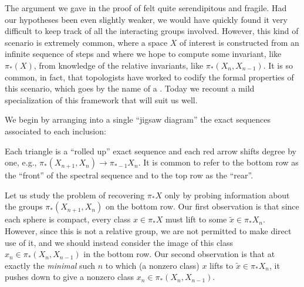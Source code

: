 The argument we gave in the proof of  felt quite serendipitous and fragile.
Had our hypotheses been even slightly weaker, we would have quickly found it very difficult to keep track of all the interacting groups involved.
However, this kind of scenario is extremely common, where a space $X$ of interest is constructed from an infinite sequence of steps
and where we hope to compute some invariant, like $\pi_*(X)$, from knowledge of the relative invariants, like $\pi_*(X_n, X_{n-1})$.
It is so common, in fact, that topologists have worked to codify the formal properties of this scenario, which goes by the name of a .
Today we recount a mild specialization of this framework that will suit us well.

We begin by arranging into a single ``jigsaw diagram'' the exact sequences associated to each inclusion:

\begin{figure*}[h]
\begin{center}
\end{center}
\end{figure*}

\noindent
Each triangle is a ``rolled up'' exact sequence and each red arrow shifts degree by one, e.g., $\pi_*(X_{n+1}, X_n) \to \pi_{*-1} X_n$.
It is common to refer to the bottom row as the ``front'' of the spectral sequence and to the top row as the ``rear''.

Let us study the problem of recovering $\pi_* X$ only by probing information about the groups $\pi_*(X_{n+1}, X_n)$ on the bottom row.
%
Our first observation is that since each sphere is compact, every class $x \in \pi_* X$ must lift to some $\widetilde x \in \pi_* X_n$.
However, since this is not a relative group, we are not permitted to make direct use of it, and we should instead consider the image of this class $x_n \in \pi_*(X_n, X_{n-1})$ in the bottom row.
Our second observation is that at exactly the \emph{minimal} such $n$ to which (a nonzero class) $x$ lifts to $\widetilde x \in \pi_* X_n$, it pushes down to give a nonzero class $x_n \in \pi_*(X_n, X_{n-1})$.

